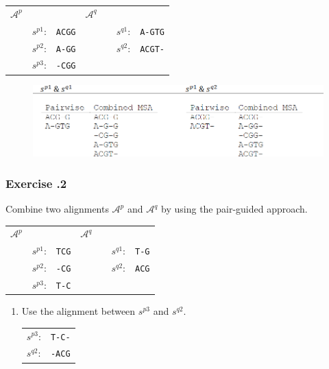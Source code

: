 \begin{table}[H]
\centering
\begin{tabular}{lllllll}
$\mathcal{A}^{p}$ & & \hspace{10em} & $\mathcal{A}^{q}$  & &  \\
 & $s^{p1}$: & \verb|ACGG| &  &  & $s^{q1}$: & \verb|A-GTG| \\
                        & $s^{p2}$: & \verb|A-GG| &      &                         & $s^{q2}$: & \verb|ACGT-| \\
                        & $s^{p3}$: &  \verb|-CGG| &      &                         &  & 
\end{tabular}
\end{table}

\begin{figure}[H]
  \centering
      \includegraphics[width=0.9 \textwidth]{fig09/pair_guided_progress_alignment.png}
\end{figure}

%
%
\newpage

%
%
\subsubsection*{Exercise \thesection.2}
Combine two alignments $\mathcal{A}^p$ and $\mathcal{A}^q$ by using the pair-guided approach.

\begin{table}[H]
\centering
\begin{tabular}{lllllll}
$\mathcal{A}^{p}$ & & \hspace{10em} & $\mathcal{A}^{q}$  & &  \\
 & $s^{p1}$: & \verb|TCG| &  &  & $s^{q1}$: & \verb|T-G| \\
                        & $s^{p2}$: & \verb|-CG| &      &                         & $s^{q2}$: & \verb|ACG| \\
                        & $s^{p3}$: &  \verb|T-C| &      &                         &  & 
\end{tabular}
\end{table}

\begin{enumerate}
\item Use the alignment between $s^{p3}$ and $s^{q2}$.

\begin{table}[H]
\centering
\begin{tabular}{ll}
 $s^{p3}$:& \verb|T-C-| \\
 $s^{q2}$:& \verb|-ACG|
\end{tabular}
\end{table}

\end{enumerate}
\bigskip 

%
